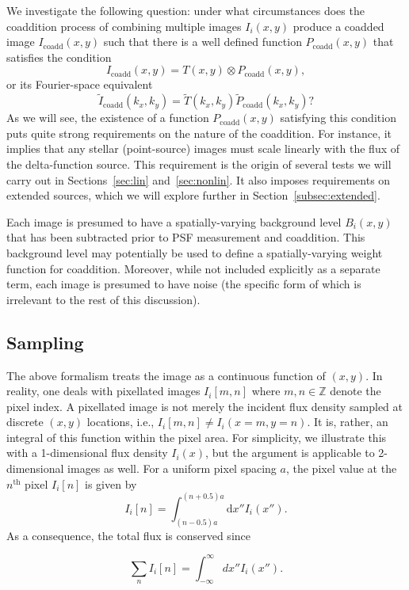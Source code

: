\documentclass{aastex63}
\newcommand{\irresponse}[1]{{#1}}
\begin{document}
\irresponse{We investigate the following question:} under what circumstances does the coaddition process \irresponse{of combining multiple images $I_i(x,y)$} produce a coadded image \irresponse{$I_\text{coadd}(x,y)$} such that there is a well defined function $P_\text{coadd}(x,y)$ that satisfies the condition
\begin{equation}\label{eq:coaddpsf}
    I_\text{coadd}(x,y) = T(x,y) \otimes P_\text{coadd}(x,y),
\end{equation}
or its Fourier-space equivalent 
\begin{equation}\label{eq:kcoaddpsf}
    \widetilde{I}_\text{coadd}(k_x,k_y) = \widetilde{T}(k_x,k_y) \widetilde{P}_\text{coadd}(k_x,k_y)?
\end{equation}
\irresponse{As we will see, the existence of a function $P_\text{coadd}(x,y)$ satisfying this condition puts quite strong requirements on the nature of the coaddition.  For instance, it implies that any stellar (point-source) images must scale linearly with the flux of the delta-function source.  This requirement is the origin of several tests we will carry out in Sections~\ref{sec:lin} and~\ref{sec:nonlin}. It also imposes requirements on extended sources, which we will explore further in Section~\ref{subsec:extended}.}

Each image is presumed to have a spatially-varying background level $B_i(x,y)$ that has been subtracted prior to PSF measurement and coaddition.  This background level may potentially be used to define a spatially-varying weight function for coaddition.  Moreover, while not included explicitly as a separate term, each image is presumed to have noise \irresponse{(the specific form of which is irrelevant to the rest of this discussion)}.

\subsection{Sampling}
\label{sec:sampling}
The above formalism treats the image as a continuous function of $(x,y)$.  In reality, one deals with pixellated images $I_i[m, n]$ where $m, n \in \mathbb{Z}$ denote the pixel index. A pixellated image is not \irresponse{merely the incident flux density} sampled at discrete $(x, y)$ locations, i.e., $I_i[m, n] \ne I_i(x=m, y=n)$. It is, rather, an integral of \irresponse{this function} within the pixel area. For simplicity, we illustrate this with a 1-dimensional \irresponse{flux density} $I_i(x)$, but the argument is applicable to 2-dimensional images as well.
For a uniform pixel spacing $a$, the pixel value at the $n^\text{th}$ pixel $I_i[n]$ is given by
\begin{equation}
    I_i[n] = \int_{(n-0.5)a}^{(n+0.5)a} \mathrm{d}x'' I_i(x'').
    \label{eq:pixellated_image}
\end{equation}
As a consequence, the total flux is conserved since
\begin{linenomath}\begin{equation}
    \sum_n I_i[n] = \int_{-\infty}^{\infty} dx'' I_i(x'').
\end{equation}\end{linenomath}
\end{document}
